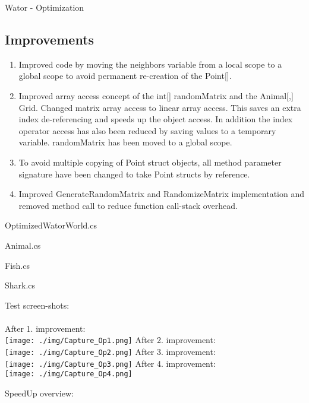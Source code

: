 \begin{section}{Wator - Optimization}

    \subsection*{Improvements}
				
		\begin{enumerate}
			\item Improved code by moving the neighbors variable from a local scope to a global scope to avoid permanent re-creation of the Point[].
			\item Improved array access concept of the int[] randomMatrix and the Animal[,] Grid. Changed matrix array access to linear array access. This saves an extra index de-referencing and speeds up the object access. In addition the index operator access has also been reduced by saving values to a temporary variable. randomMatrix has been moved to a global scope.
			\item To avoid multiple copying of Point struct objects, all method parameter signature have been changed to take Point structs by reference.
			\item Improved GenerateRandomMatrix and RandomizeMatrix implementation and removed method call to reduce function call-stack overhead.
		\end{enumerate}
		
		OptimizedWatorWorld.cs
		
		Animal.cs
		
		Fish.cs
		
		Shark.cs
		
		
		Test screen-shots:\\
		\\
		After 1. improvement:\\
		\texttt{[image: ./img/Capture\_Op1.png]}
		\FloatBarrier
		After 2. improvement:\\
		\texttt{[image: ./img/Capture\_Op2.png]}
		\FloatBarrier
		After 3. improvement:\\
		\texttt{[image: ./img/Capture\_Op3.png]}
		\FloatBarrier
		After 4. improvement:\\
		\texttt{[image: ./img/Capture\_Op4.png]}
		\FloatBarrier
		
		SpeedUp overview:\\
		

\end{section}